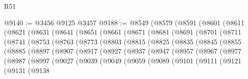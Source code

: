 \begin{lexlean}{R51}
\begin{coremodule}
@9140 := @3456 @9125 @3457
@9188 := @8549
    (@8579
      (@8591
        (@8601
          (@8611
            (@8621
              (@8631
                (@8641
                  (@8651
                    (@8661
                      (@8671
                        (@8681
                          (@8691
                            (@8701
                              (@8711
                                (@8741
                                  (@8753
                                    (@8763
                                      (@8773
                                        (@8803
                                          (@8815
                                            (@8825
                                              (@8835
                                                (@8845
                                                  (@8855
                                                    (@8885
                                                      (@8897
                                                        (@8907
                                                          (@8917
                                                            (@8927
                                                              (@8937
                                                                (@8947
                                                                  (@8957
                                                                    (@8967
                                                                      (@8977
                                                                        (@8987
                                                                          (@8997
                                                                            (@9027
                                                                              (@9039
                                                                                (@9049
                                                                                  (@9059
                                                                                    (@9089
                                                                                      (@9101
                                                                                        (@9111
                                                                                          (@9121
                                                                                            (@9131
                                                                                              (@9138

\end{coremodule}
\end{lexlean}
